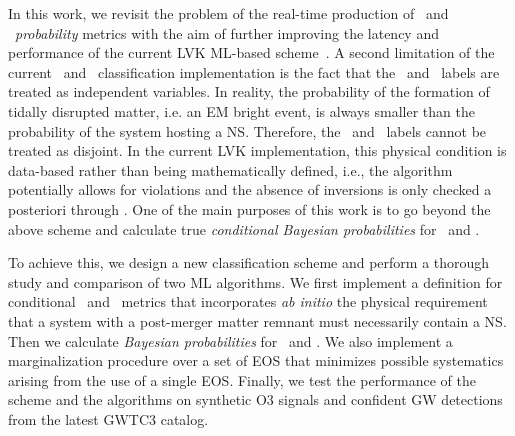 In this work, we revisit the problem of the real-time production of \hasns\ and \hasrem\ \emph{probability} metrics with the aim of further improving the latency and performance of the
current \ac{LVK} \ac{ML}-based scheme~\cite{Chatterjee:2019avs}.  A second limitation of the current \hasns\ and \hasrem\ classification implementation is the fact that the \hasns\ and \hasrem\ labels are treated as independent variables. In reality, the probability of the formation of
tidally disrupted matter, i.e. an \ac{EM} bright event, is always smaller than the probability of the system hosting a \ac{NS}. Therefore, the \hasns\ and \hasrem\ labels cannot be
treated as disjoint. In the current \ac{LVK} implementation, this physical condition is data-based rather than being mathematically defined, i.e., the algorithm potentially allows for
violations and the absence of inversions is only checked a posteriori through . One of the main purposes of this work is to go beyond the above scheme and
calculate true \emph{conditional Bayesian probabilities} for \hasns\ and \hasrem. 

To achieve this, we design a new classification scheme and perform a thorough study and comparison of two \ac{ML} algorithms. We first implement a definition for conditional \hasns\ and
\hasrem\ metrics that incorporates \emph{ab initio} the physical requirement that a system with a post-merger matter remnant must necessarily contain a \ac{NS}. Then we calculate
\emph{Bayesian probabilities} for \hasns\ and \hasrem. We also implement a marginalization procedure over a set of \ac{EOS} that minimizes possible systematics arising from the use of a
single \ac{EOS}. Finally, we test the performance of the scheme and the algorithms on synthetic \ac{O3} signals and confident \ac{GW} detections from the latest \ac{GWTC3} catalog.

